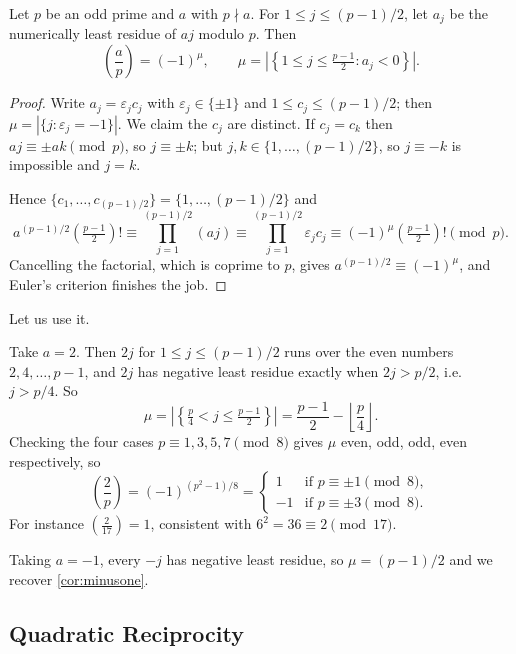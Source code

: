 \documentclass[a4paper]{scrartcl}
\newcommand{\leg}[2]{\left( \frac{#1}{#2} \right)}
\begin{document}
\begin{theorem}\label{thm:gauss}
	Let $p$ be an odd prime and $a$ with $p \nmid a$. For $1 \leq j \leq (p-1)/2$, let $a_j$ be the numerically least residue of $aj$ modulo $p$. Then
	$$
	\leg ap = (-1)^\mu, \qquad \mu = \left|\left\{ 1 \leq j \leq \tfrac{p-1}2 : a_j < 0 \right\}\right|.
	$$
\end{theorem}
\begin{proof}
	Write $a_j = \varepsilon_j c_j$ with $\varepsilon_j \in \{\pm 1\}$ and $1 \leq c_j \leq (p-1)/2$; then $\mu = |\{j : \varepsilon_j = -1\}|$. We claim the $c_j$ are distinct. If $c_j = c_k$ then $aj \equiv \pm ak \pmod p$, so $j \equiv \pm k$; but $j, k \in \{1, \dots, (p-1)/2\}$, so $j \equiv -k$ is impossible and $j = k$.

	Hence $\{c_1, \dots, c_{(p-1)/2}\} = \{1, \dots, (p-1)/2\}$ and
	$$
	a^{(p-1)/2}\left(\tfrac{p-1}2\right)! \equiv \prod_{j=1}^{(p-1)/2}(aj) \equiv \prod_{j=1}^{(p-1)/2}\varepsilon_j c_j \equiv (-1)^\mu \left(\tfrac{p-1}2\right)! \pmod p.
	$$
	Cancelling the factorial, which is coprime to $p$, gives $a^{(p-1)/2} \equiv (-1)^\mu$, and Euler's criterion finishes the job.
\end{proof}

Let us use it.

\begin{example}\label{ex:two}
	Take $a = 2$. Then $2j$ for $1 \leq j \leq (p-1)/2$ runs over the even numbers $2, 4, \dots, p-1$, and $2j$ has negative least residue exactly when $2j > p/2$, i.e.\ $j > p/4$. So
	$$
	\mu = \left|\left\{ \tfrac p4 < j \leq \tfrac{p-1}2 \right\}\right| = \frac{p-1}{2} - \left\lfloor \frac p4 \right\rfloor.
	$$
	Checking the four cases $p \equiv 1, 3, 5, 7 \pmod 8$ gives $\mu$ even, odd, odd, even respectively, so
	$$
	\leg 2p = (-1)^{(p^2 - 1)/8} = \begin{cases}
		1 & \text{if } p \equiv \pm 1 \pmod 8, \\
		-1 & \text{if } p \equiv \pm 3 \pmod 8.
	\end{cases}
	$$
	For instance $\left( \frac2{17} \right) = 1$, consistent with $6^2 = 36 \equiv 2 \pmod{17}$.
\end{example}

\begin{example}
	Taking $a = -1$, every $-j$ has negative least residue, so $\mu = (p-1)/2$ and we recover \autoref{cor:minusone}.
\end{example}

\subsection{Quadratic Reciprocity}
\end{document}
